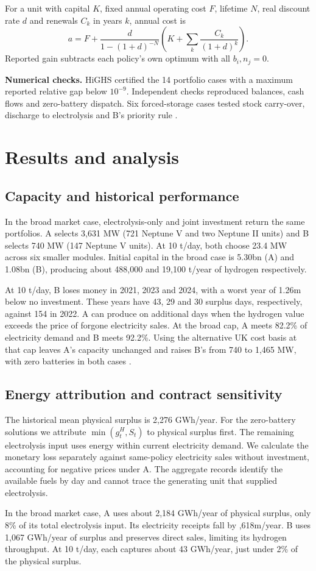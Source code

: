 For a unit with capital \(K\), fixed annual operating cost \(F\), lifetime
\(N\), real discount rate \(d\) and renewals \(C_k\) in years \(k\),
annual cost is
\begin{equation}
a=F+\frac{d}{1-(1+d)^{-N}}
\left(K+\sum_k\frac{C_k}{(1+d)^k}\right).
\label{eq:annualcost}
\end{equation}
Reported gain subtracts each policy's own optimum with all \(b_i,n_j=0\).

\textbf{Numerical checks.}
HiGHS certified the 14 portfolio cases with a maximum reported relative
gap below \(10^{-9}\). Independent checks reproduced balances, cash
flows and zero-battery dispatch. Six forced-storage cases tested stock
carry-over, discharge to electrolysis and B's priority rule \cite{v6}.

\newpage
\section{Results and analysis}\label{sec:results1}
\subsection{Capacity and historical performance}
In the broad market case, electrolysis-only and joint investment return
the same portfolios. A selects 3,631 MW (721 Neptune V and two Neptune II
units) and B selects 740 MW (147 Neptune V units). At 10 t/day, both choose
23.4 MW across six smaller modules. Initial capital in the broad case is
\gbp 5.30bn (A) and \gbp 1.08bn (B), producing about 488,000 and
19,100 t/year of hydrogen respectively.

At 10 t/day, B loses money in 2021, 2023 and 2024, with a worst
year of \gbp 1.26m below no investment. These years have 43, 29 and
30 surplus days, respectively, against 154 in 2022. A can produce on
additional days when the hydrogen value exceeds
the price of forgone electricity sales. At the broad cap, A meets 82.2\%
of electricity demand and B meets 92.2\%. Using the alternative UK cost
basis at that cap leaves A's capacity unchanged and raises B's from
740 to 1,465 MW, with zero batteries in both cases \cite{beis,v6}.

\subsection{Energy attribution and contract sensitivity}\label{sec:contract1}
The historical mean physical surplus is 2,276 GWh/year.
For the zero-battery solutions we attribute \(\min(g_t^H,S_t)\) to physical
surplus first. The remaining electrolysis input uses energy within current
electricity demand. We calculate the monetary loss separately against
same-policy electricity sales without investment, accounting for negative
prices under A. The aggregate records identify the available fuels by day
and cannot trace the generating unit that supplied electrolysis.

In the broad market case, A uses about 2,184 GWh/year of physical surplus,
only 8\% of its total electrolysis input. Its electricity receipts fall by
,618m/year. B uses 1,067 GWh/year of surplus and preserves direct
sales, limiting its hydrogen throughput. At 10 t/day, each captures
about 43 GWh/year, just under 2\% of the physical surplus.

